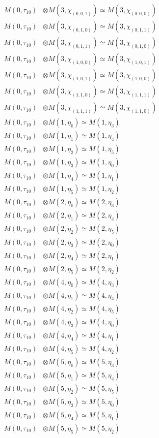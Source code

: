 \begin{align*}
M(0,\tau_{10}) &\otimes M(3,\chi_{(0,0,1)}) \simeq M(3,\chi_{(0,0,0)}) \\
M(0,\tau_{10}) &\otimes M(3,\chi_{(0,1,0)}) \simeq M(3,\chi_{(0,1,1)}) \\
M(0,\tau_{10}) &\otimes M(3,\chi_{(0,1,1)}) \simeq M(3,\chi_{(0,1,0)}) \\
M(0,\tau_{10}) &\otimes M(3,\chi_{(1,0,0)}) \simeq M(3,\chi_{(1,0,1)}) \\
M(0,\tau_{10}) &\otimes M(3,\chi_{(1,0,1)}) \simeq M(3,\chi_{(1,0,0)}) \\
M(0,\tau_{10}) &\otimes M(3,\chi_{(1,1,0)}) \simeq M(3,\chi_{(1,1,1)}) \\
M(0,\tau_{10}) &\otimes M(3,\chi_{(1,1,1)}) \simeq M(3,\chi_{(1,1,0)}) \\
M(0,\tau_{10}) &\otimes M(1,\eta_{0}) \simeq M(1,\eta_{3}) \\
M(0,\tau_{10}) &\otimes M(1,\eta_{1}) \simeq M(1,\eta_{4}) \\
M(0,\tau_{10}) &\otimes M(1,\eta_{2}) \simeq M(1,\eta_{5}) \\
M(0,\tau_{10}) &\otimes M(1,\eta_{3}) \simeq M(1,\eta_{0}) \\
M(0,\tau_{10}) &\otimes M(1,\eta_{4}) \simeq M(1,\eta_{1}) \\
M(0,\tau_{10}) &\otimes M(1,\eta_{5}) \simeq M(1,\eta_{2}) \\
M(0,\tau_{10}) &\otimes M(2,\eta_{0}) \simeq M(2,\eta_{3}) \\
M(0,\tau_{10}) &\otimes M(2,\eta_{1}) \simeq M(2,\eta_{4}) \\
M(0,\tau_{10}) &\otimes M(2,\eta_{2}) \simeq M(2,\eta_{5}) \\
M(0,\tau_{10}) &\otimes M(2,\eta_{3}) \simeq M(2,\eta_{0}) \\
M(0,\tau_{10}) &\otimes M(2,\eta_{4}) \simeq M(2,\eta_{1}) \\
M(0,\tau_{10}) &\otimes M(2,\eta_{5}) \simeq M(2,\eta_{2}) \\
M(0,\tau_{10}) &\otimes M(4,\eta_{0}) \simeq M(4,\eta_{3}) \\
M(0,\tau_{10}) &\otimes M(4,\eta_{1}) \simeq M(4,\eta_{4}) \\
M(0,\tau_{10}) &\otimes M(4,\eta_{2}) \simeq M(4,\eta_{5}) \\
M(0,\tau_{10}) &\otimes M(4,\eta_{3}) \simeq M(4,\eta_{0}) \\
M(0,\tau_{10}) &\otimes M(4,\eta_{4}) \simeq M(4,\eta_{1}) \\
M(0,\tau_{10}) &\otimes M(4,\eta_{5}) \simeq M(4,\eta_{2}) \\
M(0,\tau_{10}) &\otimes M(5,\eta_{0}) \simeq M(5,\eta_{3}) \\
M(0,\tau_{10}) &\otimes M(5,\eta_{1}) \simeq M(5,\eta_{4}) \\
M(0,\tau_{10}) &\otimes M(5,\eta_{2}) \simeq M(5,\eta_{5}) \\
M(0,\tau_{10}) &\otimes M(5,\eta_{3}) \simeq M(5,\eta_{0}) \\
M(0,\tau_{10}) &\otimes M(5,\eta_{4}) \simeq M(5,\eta_{1}) \\
M(0,\tau_{10}) &\otimes M(5,\eta_{5}) \simeq M(5,\eta_{2}) \\
\end{align*}

